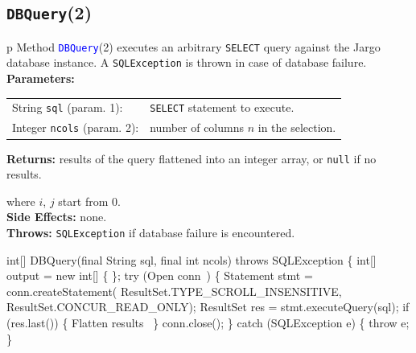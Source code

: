 \subsection{\texttt{DBQuery}(2)}
\begin{tabular}{p{\textwidth}}
\toprule
{}
Method \textcolor{blue}{{\tt{}\protect{}DBQuery}}(2) executes an arbitrary {\tt{}SELECT}
query against the Jargo database instance.
A {\tt{}SQLException} is thrown in case of database failure.\\
\midrule
\textbf{Parameters:} \\
\begin{tabular}{lp{116mm}}
String {\tt{}sql} (param. 1):&{\tt{}SELECT} statement to execute.\\
Integer {\tt{}ncols} (param. 2):&number of columns $n$ in the selection.\\
\end{tabular}
\textbf{Returns:} results of the query flattened into an integer array,
or {\tt{}null} if no results.


where $i$, $j$ start from 0.\\
\textbf{Side Effects:} none.\\
\textbf{Throws:} {\tt{}SQLException} if database failure is encountered.\\
\bottomrule
\end{tabular}
\nwenddocs{}\endmoddef{}
int[] DBQuery(final String sql, final int ncols) throws SQLException \{
  int[] output = new int[] \{ \};
  try (\LA{}Open \code{}conn\edoc{}~{\nwtagstyle{}}\RA{}) \{
    Statement stmt = conn.createStatement(
      ResultSet.TYPE_SCROLL_INSENSITIVE, ResultSet.CONCUR_READ_ONLY);
    ResultSet res = stmt.executeQuery(sql);
    if (res.last()) \{
      \LA{}Flatten results~{\nwtagstyle{}}\RA{}
    \}
    conn.close();
  \} catch (SQLException e) \{
    throw e;
  \}
